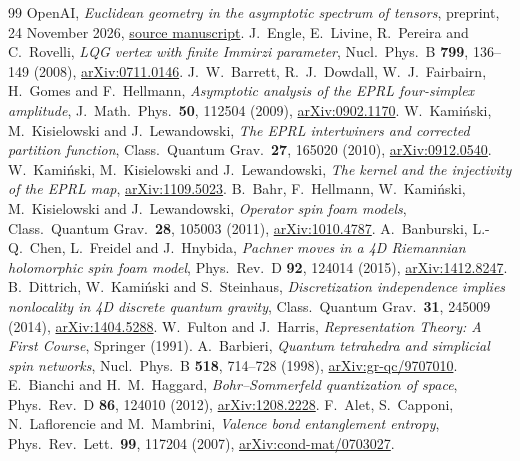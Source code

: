 \documentclass[11pt]{article}
\theoremstyle{remark}
\begin{document}
{\small\begin{thebibliography}{99}
\setlength{\itemsep}{3pt}\setlength{\parsep}{0pt}
 OpenAI, \emph{Euclidean geometry in the asymptotic spectrum of tensors}, preprint, 24 November 2026,
 \href{https://github.com/openai/math/blob/main/preprints/Euclidean-geometry-in-the-asymptotic-spectrum-of-tensors-November-24-2026/paper.pdf}{source manuscript}.
 J.~Engle, E.~Livine, R.~Pereira and C.~Rovelli,
 \emph{LQG vertex with finite Immirzi parameter}, Nucl.\ Phys.\ B \textbf{799}, 136--149 (2008),
 \href{https://arxiv.org/abs/0711.0146}{arXiv:0711.0146}.
 J.~W.~Barrett, R.~J.~Dowdall, W.~J.~Fairbairn, H.~Gomes and F.~Hellmann,
 \emph{Asymptotic analysis of the EPRL four-simplex amplitude}, J.\ Math.\ Phys.\ \textbf{50}, 112504 (2009),
 \href{https://arxiv.org/abs/0902.1170}{arXiv:0902.1170}.
 W.~Kami\'nski, M.~Kisielowski and J.~Lewandowski,
 \emph{The EPRL intertwiners and corrected partition function}, Class.\ Quantum Grav.\ \textbf{27}, 165020 (2010),
 \href{https://arxiv.org/abs/0912.0540}{arXiv:0912.0540}.
 W.~Kami\'nski, M.~Kisielowski and J.~Lewandowski,
 \emph{The kernel and the injectivity of the EPRL map},
 \href{https://arxiv.org/abs/1109.5023}{arXiv:1109.5023}.
 B.~Bahr, F.~Hellmann, W.~Kami\'nski, M.~Kisielowski and J.~Lewandowski,
 \emph{Operator spin foam models}, Class.\ Quantum Grav.\ \textbf{28}, 105003 (2011),
 \href{https://arxiv.org/abs/1010.4787}{arXiv:1010.4787}.
 A.~Banburski, L.-Q.~Chen, L.~Freidel and J.~Hnybida,
 \emph{Pachner moves in a 4D Riemannian holomorphic spin foam model},
 Phys.\ Rev.\ D \textbf{92}, 124014 (2015),
 \href{https://arxiv.org/abs/1412.8247}{arXiv:1412.8247}.
 B.~Dittrich, W.~Kami\'nski and S.~Steinhaus,
 \emph{Discretization independence implies nonlocality in 4D discrete quantum gravity},
 Class.\ Quantum Grav.\ \textbf{31}, 245009 (2014),
 \href{https://arxiv.org/abs/1404.5288}{arXiv:1404.5288}.
 W.~Fulton and J.~Harris, \emph{Representation Theory: A First Course}, Springer (1991).
 A.~Barbieri, \emph{Quantum tetrahedra and simplicial spin networks},
 Nucl.\ Phys.\ B \textbf{518}, 714--728 (1998),
 \href{https://arxiv.org/abs/gr-qc/9707010}{arXiv:gr-qc/9707010}.
 E.~Bianchi and H.~M.~Haggard, \emph{Bohr--Sommerfeld quantization of space}, Phys.\ Rev.\ D \textbf{86}, 124010 (2012),
 \href{https://arxiv.org/abs/1208.2228}{arXiv:1208.2228}.
 F.~Alet, S.~Capponi, N.~Laflorencie and M.~Mambrini, \emph{Valence bond entanglement entropy}, Phys.\ Rev.\ Lett.\ \textbf{99}, 117204 (2007),
 \href{https://arxiv.org/abs/cond-mat/0703027}{arXiv:cond-mat/0703027}.
\end{thebibliography}}
\end{document}
